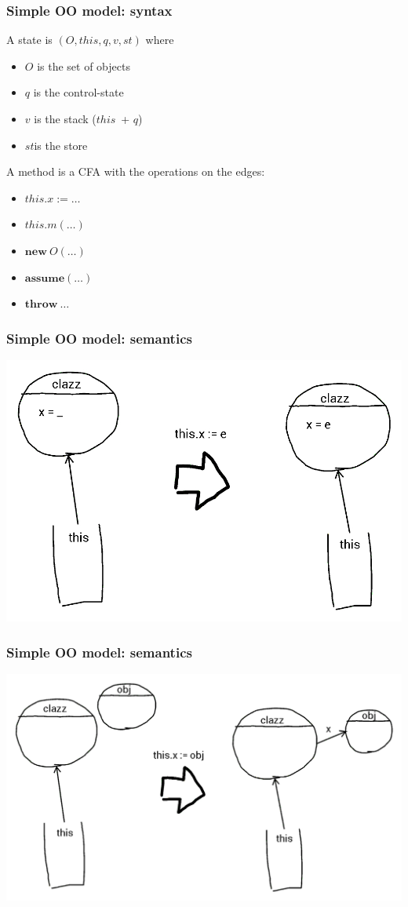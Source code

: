 \documentclass{beamer}
\newcommand{\this}{\ensuremath{\mathit{this}}}
\newcommand{\st}{\ensuremath{\mathit{st}}}
\newcommand{\new}{\ensuremath{\mathbf{new}}}
\newcommand{\assume}{\ensuremath{\mathbf{assume}}}
\newcommand{\throw}{\ensuremath{\mathbf{throw}}}
\begin{document}
\begin{frame}
  \frametitle{Simple OO model: syntax}
  A state is $(O, \this, q, v, \st)$ where
  \begin{itemize}
  \item $O$ is the set of objects
  \item $q$ is the control-state
  \item $v$ is the stack (\this\ + $q$)
  \item \st is the store
  \end{itemize}

  A method is a CFA with the operations on the edges:
  \begin{itemize}
  \item $\this.x := \ldots$ 
  \item $\this.m(\ldots)$
  \item $\new\ O(\ldots)$
  \item $\assume(\ldots)$
  \item $\throw\ \ldots$
  \end{itemize}
\end{frame}

\begin{frame}
  \frametitle{Simple OO model: semantics}
  \includegraphics[width=\linewidth]{assign}
\end{frame}

\begin{frame}
  \frametitle{Simple OO model: semantics}
  \includegraphics[width=\linewidth]{assign_obj}
\end{frame}
\end{document}
